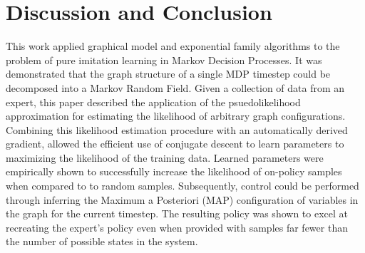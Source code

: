 \documentclass{article} %
\begin{document}
\section{Discussion and Conclusion}
This work applied graphical model and exponential family algorithms to the problem of pure imitation learning in Markov Decision Processes. It was demonstrated that the graph structure of a single MDP timestep could be decomposed into a Markov Random Field. Given a collection of data from an expert, this paper described the application of the psuedolikelihood approximation for estimating the likelihood of arbitrary graph configurations. Combining this likelihood estimation procedure with an automatically derived gradient, allowed the efficient use of conjugate descent to learn parameters to maximizing the likelihood of the training data. Learned parameters were empirically shown to successfully increase the likelihood of on-policy samples when compared to to random samples. Subsequently, control could be performed through inferring the Maximum a Posteriori (MAP) configuration of variables in the graph for the current timestep. The resulting policy was shown to excel at recreating the expert's policy even when provided with samples far fewer than the number of possible states in the system. 



\end{document}
